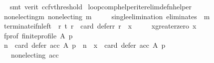 \begin{isabellebody}
\ \ \ \ \isamarkupfalse%
\ {\isacharparenleft}{\kern0pt}smt\ {\isacharparenleft}{\kern0pt}verit{\isacharcomma}{\kern0pt}\ ccfv{\isacharunderscore}{\kern0pt}threshold{\isacharparenright}{\kern0pt}{\isacharparenright}{\kern0pt}\isanewline
{}\isamarkupfalse%
%
\endisatagproof
{\isafoldproof}%
%
\isadelimproof
\isanewline
%
\endisadelimproof
\isanewline
{}\isamarkupfalse%
\ loop{\isacharunderscore}{\kern0pt}comp{\isacharunderscore}{\kern0pt}helper{\isacharunderscore}{\kern0pt}iter{\isacharunderscore}{\kern0pt}elim{\isacharunderscore}{\kern0pt}def{\isacharunderscore}{\kern0pt}n{\isacharunderscore}{\kern0pt}helper{\isacharcolon}{\kern0pt}\isanewline
\ \ \isanewline
\ \ \ \ non{\isacharunderscore}{\kern0pt}electing{\isacharunderscore}{\kern0pt}m{\isacharcolon}{\kern0pt}\ {\isachardoublequoteopen}non{\isacharunderscore}{\kern0pt}electing\ m{\isachardoublequoteclose}\ \isanewline
\ \ \ \ single{\isacharunderscore}{\kern0pt}elimination{\isacharcolon}{\kern0pt}\ {\isachardoublequoteopen}eliminates\ {}\ m{\isachardoublequoteclose}\ \isanewline
\ \ \ \ terminate{\isacharunderscore}{\kern0pt}if{\isacharunderscore}{\kern0pt}n{\isacharunderscore}{\kern0pt}left{\isacharcolon}{\kern0pt}\ {\isachardoublequoteopen}{\isasymforall}\ r{\isachardot}{\kern0pt}\ {\isacharparenleft}{\kern0pt}{\isacharparenleft}{\kern0pt}t\ r{\isacharparenright}{\kern0pt}\ {\isasymlongleftrightarrow}\ {\isacharparenleft}{\kern0pt}card\ {\isacharparenleft}{\kern0pt}defer{\isacharunderscore}{\kern0pt}r\ r{\isacharparenright}{\kern0pt}\ {\isacharequal}{\kern0pt}\ x{\isacharparenright}{\kern0pt}{\isacharparenright}{\kern0pt}{\isachardoublequoteclose}\ \isanewline
\ \ \ \ x{\isacharunderscore}{\kern0pt}greater{\isacharunderscore}{\kern0pt}zero{\isacharcolon}{\kern0pt}\ {\isachardoublequoteopen}x\ {\isachargreater}{\kern0pt}\ {}{\isachardoublequoteclose}\ \isanewline
\ \ \ \ f{\isacharunderscore}{\kern0pt}prof{\isacharcolon}{\kern0pt}\ {\isachardoublequoteopen}finite{\isacharunderscore}{\kern0pt}profile\ A\ p{\isachardoublequoteclose}\isanewline
\ \ \isanewline
\ \ \ \ {\isachardoublequoteopen}{\isacharparenleft}{\kern0pt}n\ {\isacharequal}{\kern0pt}\ card\ {\isacharparenleft}{\kern0pt}defer\ acc\ A\ p{\isacharparenright}{\kern0pt}\ {\isasymand}\ n\ {\isasymge}\ x\ {\isasymand}\ card\ {\isacharparenleft}{\kern0pt}defer\ acc\ A\ p{\isacharparenright}{\kern0pt}\ {\isachargreater}{\kern0pt}\ {}\ {\isasymand}\isanewline
\ \ \ \ \ \ non{\isacharunderscore}{\kern0pt}electing\ acc{\isacharparenright}{\kern0pt}\ {\isasymlongrightarrow}\isanewline

\end{isabellebody}

